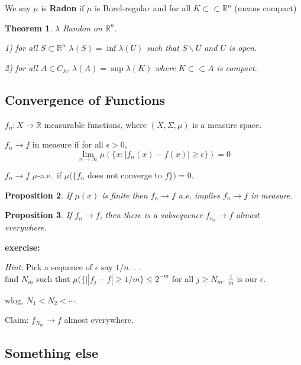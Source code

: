 \documentclass[11pt]{article}
\newtheorem{thm}{Theorem}[section]
\newtheorem{prop}[thm]{Proposition}
\newenvironment{defn}[1][Definition]{\begin{trivlist}
\item[\hskip \labelsep {\bfseries #1}]}{\end{trivlist}}
\newcommand{\cd}{\cdots}
\newcommand{\ra}{\rightarrow}
\newcommand{\sbs}{\subset}
\newcommand{\bs}{\backslash}
\newcommand{\ep}{\epsilon}
\newcommand{\Si}{\Sigma}
\newcommand{\la}{\lambda}
\newcommand{\fr}[2]{\frac{#1}{#2}}
\newcommand{\re}{\mathbb{R}}
\begin{document}
\begin{defn}
We say $\mu$ is {\bf Radon} if $\mu$ is Borel-regular and for all  $K\sbs\sbs\re^n$ (means compact)
\end{defn}

\begin{thm}
$\la$ Randon on $\re^n$. 

1) for all $S\sbs\re^n$ $\la(S)=\inf\la(U)$ such that $S\bs U$ and $U$ is open.

2) for all $A\in C_{\la}$, $\la(A)=\sup\la(K)$ where $K\sbs\sbs A$ is compact.
\end{thm}

\subsection{Convergence of Functions}

$f_n:X\ra\re$ measurable functions, where $(X,\Si,\mu)$ is a measure space. 

\begin{defn}
$f_n\ra f$ in measure if for all $\ep>0$, \[\lim_{n\ra\infty}\mu(\{x: |f_n(x)-f(x)|\ge\ep\})=0\]
\end{defn}

\begin{defn}
$f_n\ra f$ $\mu$-a.e.\ if $\mu(\{f_n $ does not converge to $f\})=0$. 
\end{defn}

\begin{prop}
If $\mu(x)$ is finite then $f_n\ra f$ a.e. implies $f_n\ra f$ in measure. 
\end{prop}

\begin{prop}
If $f_n\ra f$, then there is a subsequence $f_{n_k}\ra f$ almost everywhere.
\end{prop}
{\bf exercise:}

{\it Hint}: Pick a sequence of $\ep$ say $1/n$. . .\\
find $N_m$ such that $\mu(\{\mid |f_j-f|\ge 1/m\}\le 2^{-m}$ for all $j\ge N_m$. $\fr{1}{m}$ is our $\ep$. 

wlog, $N_1<N_2<\cd$. 

Claim: $f_{N_m}\ra f$ almost everywhere. 

\subsection{Something else}
\end{document}
